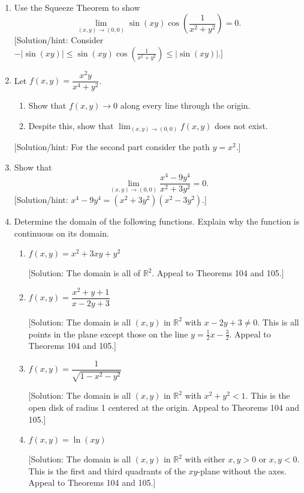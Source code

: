 \ 


\begin{enumerate}
\item  Use the Squeeze Theorem to show
\[
\lim_{(x,y) \rightarrow (0,0)} \sin(xy) \cos\left(\frac{1}{x^2+y^2}\right) = 0.
\]  
[Solution/hint:  Consider $-|\sin(xy)| \leq \sin(xy) \cos\left(\frac{1}{x^2+y^2}\right) \leq |\sin(xy)|$.]  \\

\item  Let $f(x, y) = \dfrac{x^2y}{x^4 + y^2}$.
\begin{enumerate}
\item  Show that $f(x, y) \rightarrow 0$ along every line through the origin. \\


\item  Despite this, show that $\lim_{(x, y) \rightarrow (0, 0)} f(x, y)$ does not exist.
\end{enumerate}
[Solution/hint:  For the second part consider the path $y = x^2$.]  \\


\item  Show that 
\[
\lim_{(x,y) \rightarrow (0,0)} \frac{x^4 - 9y^4}{x^2 + 3y^2} = 0.
\]
[Solution/hint:  $x^4 - 9y^4 = (x^2 + 3y^2)(x^2 - 3y^2)$.]  \\

\item  Determine the domain of the following functions.  Explain why the function is continuous on its domain.
\begin{enumerate}
\item  $f(x, y) = x^2 + 3xy + y^2$

[Solution:  The domain is all of $\mathbb{R}^2$.  Appeal to Theorems 104 and 105.]  \\

\item  $f(x, y) = \dfrac{x^2 + y + 1}{x - 2y + 3}$

[Solution:  The domain is all $(x, y)$ in $\mathbb{R}^2$ with $x - 2y + 3 \neq 0$.  This is all points in the plane except those on the line $y = \frac{1}{2}x - \frac{3}{2}$.  Appeal to Theorems 104 and 105.]  \\

\item  $f(x, y) = \dfrac{1}{\sqrt{1 - x^2 - y^2}}$

[Solution:  The domain is all $(x, y)$ in $\mathbb{R}^2$ with $x^2 + y^2 < 1$.  This is the open disk of radius 1 centered at the origin.  Appeal to Theorems 104 and 105.]  \\

\item  $f(x, y) = \ln(xy)$

[Solution:  The domain is all $(x, y)$ in $\mathbb{R}^2$ with either $x, y > 0$ or $x, y < 0$.  This is the first and third quadrants of the $xy$-plane without the axes.  Appeal to Theorems 104 and 105.]  \\

\end{enumerate}

\end{enumerate}